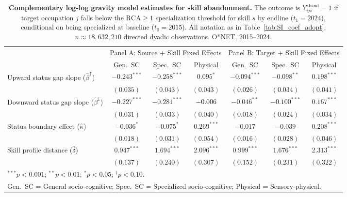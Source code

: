 \begin{table}[H]
\centering
\caption{\textbf{Complementary log-log gravity model estimates for skill abandonment.} The outcome is $Y^{\mathrm{aband}}_{ijs} = 1$ if target occupation $j$ falls below the $\mathrm{RCA} \geq 1$ specialization threshold for skill $s$ by endline ($t_1 = 2024$), conditional on being specialized at baseline ($t_0 = 2015$). All notation as in Table~\ref{tab:SI_coef_adopt}. $n \approx 18{,}632{,}210$ directed dyadic observations. O*NET, 2015--2024.}
\label{tab:SI_coef_aband}
\renewcommand{\arraystretch}{1.2}
\begin{tabular}{lcccccc}
\toprule
 & \multicolumn{3}{c}{Panel A: Source + Skill Fixed Effects}
 & \multicolumn{3}{c}{Panel B: Target + Skill Fixed Effects} \\
\cmidrule(lr){2-4} \cmidrule(lr){5-7}
 & Gen.\ SC & Spec.\ SC & Physical
 & Gen.\ SC & Spec.\ SC & Physical \\
\midrule
Upward status gap slope ($\hat{\beta}^{\uparrow}$)
  & $-0.243^{***}$ & $-0.258^{***}$ & $0.095^{*}$
  & $-0.094^{***}$ & $-0.098^{**}$ & $0.198^{***}$ \\
  & $(0.035)$ & $(0.043)$ & $(0.043)$
  & $(0.026)$ & $(0.034)$ & $(0.041)$ \\[4pt]
Downward status gap slope ($\hat{\beta}^{\downarrow}$)
  & $-0.227^{***}$ & $-0.281^{***}$ & $-0.006$
  & $-0.046^{**}$ & $-0.100^{***}$ & $0.167^{***}$ \\
  & $(0.031)$ & $(0.033)$ & $(0.040)$
  & $(0.018)$ & $(0.024)$ & $(0.034)$ \\[4pt]
Status boundary effect ($\hat{\kappa}$)
  & $-0.036^{*}$ & $-0.075^{*}$ & $0.269^{***}$
  & $-0.017$ & $-0.039$ & $0.208^{***}$ \\
  & $(0.018)$ & $(0.031)$ & $(0.054)$
  & $(0.016)$ & $(0.028)$ & $(0.046)$ \\[4pt]
Skill profile distance ($\hat{\delta}$)
  & $0.947^{***}$ & $1.694^{***}$ & $2.096^{***}$
  & $0.999^{***}$ & $1.676^{***}$ & $2.313^{***}$ \\
  & $(0.137)$ & $(0.240)$ & $(0.307)$
  & $(0.152)$ & $(0.231)$ & $(0.322)$ \\
\bottomrule
\multicolumn{7}{l}{\footnotesize $^{***}p<0.001$; $^{**}p<0.01$; $^{*}p<0.05$; $^{\dagger}p<0.10$.} \\
\multicolumn{7}{l}{\footnotesize Gen.~SC = General socio-cognitive; Spec.~SC = Specialized socio-cognitive; Physical = Sensory-physical.}
\end{tabular}
\end{table}
